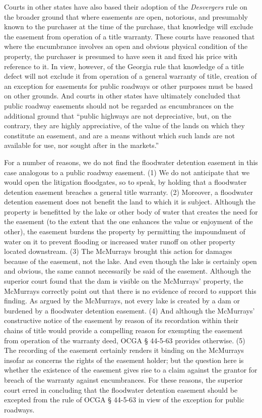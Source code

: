 Courts in other states have also based their adoption of the \textit{Desvergers}
rule on the broader ground that where easements are open, notorious, and
presumably known to the purchaser at the time of the purchase, that knowledge
will exclude the easement from operation of a title warranty. These courts have
reasoned that where the encumbrance involves an open and obvious physical
condition of the property, the purchaser is presumed to have seen it and fixed
his price with reference to it. In view, however, of the Georgia rule that
knowledge of a title defect will not exclude it from operation of a general
warranty of title, creation of an exception for easements for public roadways
or other purposes must be based on other grounds. And courts in other states
have ultimately concluded that public roadway easements should not be regarded
as encumbrances on the additional ground that ``public highways are not
depreciative, but, on the contrary, they are highly appreciative, of the value
of the lands on which they constitute an easement, and are a means without
which such lands are not available for use, nor sought after in the markets.'' 

For a number of reasons, we do not find the floodwater detention easement in
this case analogous to a public roadway easement. (1) We do not anticipate that
we would open the litigation floodgates, so to speak, by holding that a
floodwater detention easement breaches a general title warranty. (2) Moreover,
a floodwater detention easement does not benefit the land to which it is
subject. Although the property is benefitted by the lake or other body of water
that creates the need for the easement (to the extent that the one enhances the
value or enjoyment of the other), the easement burdens the property by
permitting the impoundment of water on it to prevent flooding or increased
water runoff on other property located downstream. (3) The McMurrays brought
this action for damages because of the easement, not the lake. And even though
the lake is certainly open and obvious, the same cannot necessarily be said of
the easement. Although the superior court found that the dam is visible on the
McMurrays' property, the McMurrays correctly point out that there is no
evidence of record to support this finding. As argued by the McMurrays, not
every lake is created by a dam or burdened by a floodwater detention easement.
(4) And although the McMurrays' constructive notice of the easement by reason
of its recordation within their chains of title would provide a compelling
reason for exempting the easement from operation of the warranty deed, OCGA
{\S} 44-5-63 provides otherwise. (5) The recording of the easement certainly
renders it binding on the McMurrays insofar as concerns the rights of the
easement holder; but the question here is whether the existence of the easement
gives rise to a claim against the grantor for breach of the warranty against
encumbrances. For these reasons, the superior court erred in concluding that
the floodwater detention easement should be excepted from the rule of OCGA {\S}
44-5-63 in view of the exception for public roadways. 

